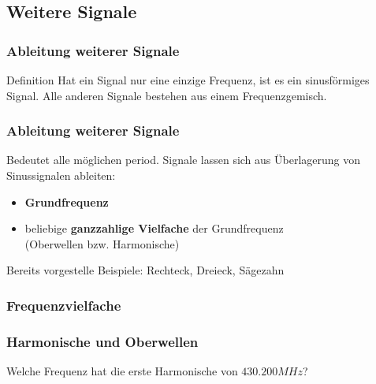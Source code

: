 \subsection{Weitere Signale}

\begin{frame}
  \frametitle{Ableitung weiterer Signale}

  \begin{block}{Definition}
    Hat ein Signal nur eine einzige Frequenz, ist es ein sinusförmiges Signal. Alle anderen Signale bestehen aus einem Frequenzgemisch.
  \end{block}

\end{frame}

\begin{frame}
  \frametitle{Ableitung weiterer Signale}

  Bedeutet alle möglichen period. Signale lassen sich aus Überlagerung von
  Sinussignalen ableiten:

  \begin{itemize}
    \item \textbf{Grundfrequenz}
    \item beliebige \textbf{ganzzahlige Vielfache} der Grundfrequenz \\
      (Oberwellen bzw. Harmonische)
  \end{itemize}

  \bigskip Bereits vorgestelle Beispiele: Rechteck, Dreieck, Sägezahn

\end{frame}

\subsubsection{Frequenzvielfache}

\begin{frame}
  \frametitle{Harmonische und Oberwellen}

  \begin{block}{Welche Frequenz hat die erste Harmonische von $430.200 MHz$?}
  \end{block}


\end{frame}

